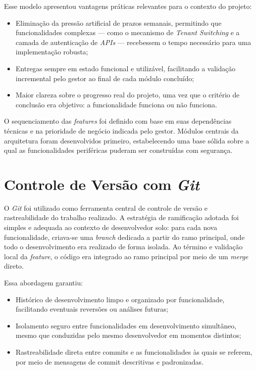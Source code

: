 Esse modelo apresentou vantagens práticas relevantes para o contexto do projeto:

\begin{itemize}
    \item Eliminação da pressão artificial de prazos semanais, permitindo que funcionalidades complexas — como o mecanismo de \textit{Tenant Switching} e a camada de autenticação de \textit{APIs} — recebessem o tempo necessário para uma implementação robusta;
    \item Entregas sempre em estado funcional e utilizável, facilitando a validação incremental pelo gestor ao final de cada módulo concluído;
    \item Maior clareza sobre o progresso real do projeto, uma vez que o critério de conclusão era objetivo: a funcionalidade funciona ou não funciona.
\end{itemize}

O sequenciamento das \textit{features} foi definido com base em suas dependências técnicas e na prioridade de negócio indicada pelo gestor. Módulos centrais da arquitetura foram desenvolvidos primeiro, estabelecendo uma base sólida sobre a qual as funcionalidades periféricas puderam ser construídas com segurança.

\section{Controle de Versão com \textit{Git}}

O \textit{Git} foi utilizado como ferramenta central de controle de versão e rastreabilidade do trabalho realizado. A estratégia de ramificação adotada foi simples e adequada ao contexto de desenvolvedor solo: para cada nova funcionalidade, criava-se uma \textit{branch} dedicada a partir do ramo principal, onde todo o desenvolvimento era realizado de forma isolada. Ao término e validação local da \textit{feature}, o código era integrado ao ramo principal por meio de um \textit{merge} direto.

Essa abordagem garantiu:

\begin{itemize}
    \item Histórico de desenvolvimento limpo e organizado por funcionalidade, facilitando eventuais reversões ou análises futuras;
    \item Isolamento seguro entre funcionalidades em desenvolvimento simultâneo, mesmo que conduzidas pelo mesmo desenvolvedor em momentos distintos;
    \item Rastreabilidade direta entre commits e as funcionalidades às quais se referem, por meio de mensagens de commit descritivas e padronizadas.
\end{itemize}

